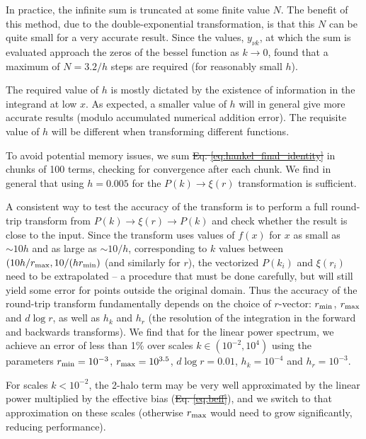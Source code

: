 \documentclass[5p,aas_macros]{elsarticle}
\providecommand{\DIFaddtex}[1]{{\protect\color{blue}\uwave{#1}}} %
\providecommand{\DIFdeltex}[1]{{\protect\color{red}\sout{#1}}}                      %
\providecommand{\DIFaddbegin}{} %
\providecommand{\DIFaddend}{} %
\providecommand{\DIFdelbegin}{} %
\providecommand{\DIFdelend}{} %
\providecommand{\DIFadd}[1]{\texorpdfstring{\DIFaddtex{#1}}{#1}} %
\providecommand{\DIFdel}[1]{\texorpdfstring{\DIFdeltex{#1}}{}} %
\begin{document}
In practice, the infinite sum is truncated at some finite value $N$. 
The benefit of this method, due to the double-exponential transformation, is that this $N$ can be quite small for a very accurate result. 
Since the values, $y_{\nu k}$, at which the sum is evaluated approach the zeros of the bessel function as $k \rightarrow 0$, \citet{Murray2019} found that a maximum of $N=3.2/h$ steps are required (for reasonably small $h$).

 The required value of $h$ is mostly dictated by the existence of information in the integrand at low $x$. As expected, a smaller value of $h$ will in general give more accurate results (modulo accumulated numerical addition error). The requisite value of $h$ will be different when transforming 
 different functions. 

 To avoid potential memory issues, we sum \DIFdelbegin \DIFdel{Eq. \ref{eq:hankel_final_identity} }\DIFdelend \DIFaddbegin \DIFadd{\mbox{%
\cref{eq:hankel_final_identity} }\hspace{0pt}%
}\DIFaddend in chunks of 100 terms, checking for convergence after each chunk.
 We find in general that using $h=0.005$ for the $P(k) \rightarrow \xi(r)$ transformation is sufficient. 

 A consistent way to test the accuracy of the transform is to perform a full round-trip transform from $P(k) \rightarrow \xi(r) \rightarrow P(k)$ and check whether the result is close to the input.
 Since the transform uses values of $f(x)$ for $x$ as small as $\sim 10h$ and as large as $\sim 10/h$, corresponding to $k$ values between $(10 h / r_{\rm max}, 10/(h r_{\rm min})$ (and similarly for $r$),
 the vectorized $P(k_i)$ and $\xi(r_i)$ need to be extrapolated -- a procedure that must be done carefully, but will still yield some error for points outside the original domain.
 Thus the accuracy of the round-trip transform fundamentally depends on the choice of $r$-vector: $r_{\rm min}$, $r_{\rm max}$ and $d\log r$, as well as $h_k$ and $h_r$ (the resolution of the integration in the forward and backwards transforms). 
 We find that for the linear power spectrum, we achieve an error of less than 1\% over scales $k \in (10^{-2}, 10^4)$ using the parameters $r_{\rm min} = 10^{-3}$, $r_{\rm max} = 10^{3.5}$, $d\log r = 0.01$, $h_k = 10^{-4}$ and $h_r = 10^{-3}$.

 For scales $k < 10^{-2}$, the 2-halo term may be very well approximated by the linear power multiplied by the effective bias (\DIFdelbegin \DIFdel{Eq. \ref{eq:beff}}\DIFdelend \DIFaddbegin \DIFadd{\mbox{%
\cref{eq:beff}}\hspace{0pt}%
}\DIFaddend ), and we switch to that approximation on these scales (otherwise $r_{\rm max}$ would need to grow significantly, reducing performance).
\end{document}
